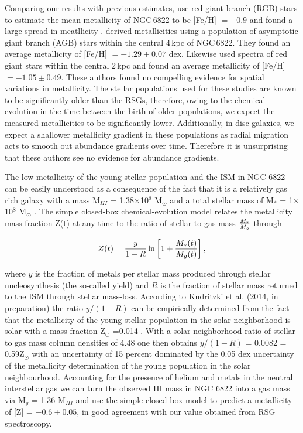 \documentclass[iop]{emulateapj}
\begin{document}
Comparing our results with previous estimates,
\cite{2001MNRAS.327..918T} use red giant branch (RGB) stars to estimate the mean metallicity of NGC\,6822 to be
[Fe/H] $=-0.9$ and found a large spread in meatllicity 
\citep[see Figure 19 in ][]{2001MNRAS.327..918T}.
\cite{2012A&A...540A.135S} derived metallicities using a population of asymptotic giant branch (AGB) stars within the central 4\,kpc of NGC\,6822.
They found an average metallicity of [Fe/H] $=-1.29\pm0.07$ dex.
Likewise
\cite{2013ApJ...779..102K}
used spectra of red giant stars within the central 2\,kpc and found an average metallicity of
[Fe/H] $=-1.05\pm0.49$.
These authors found no compelling evidence for spatial variations in metallicity.
The stellar populations used for these studies are known to be significantly older than the RSGs,
therefore, owing to the chemical evolution in the time between the birth of older populations, we expect the measured metallicities to be significantly lower.
Additionally, in disc galaxies, we expect a shallower metallicity gradient in these populations as radial migration acts to smooth out abundance gradients over time.
Therefore it is unsurprising that these authors see no evidence for abundance gradients.

The low metallicity of the young stellar population and the ISM in NGC 6822 can be easily understood as a consequence of the fact that it is a relatively gas rich galaxy with a mass
M$_{HI}$ = 1.38$\times$10$^{8}$ M$_{\odot}$
\citep{2004AJ....128...16K} and a total stellar mass of
M$_{*}$ = 1$\times$10$^{8}$ M$_{\odot}$
\citep{2014ApJ...789..147W}.
The simple closed-box chemical-evolution model relates the metallicity mass fraction Z(t) at any time to the ratio of stellar to gas mass $M_{*}\over M_{g}$ through

\begin{equation}\label{closed-box}
Z(t) = {y \over 1-R } \ln \left[ 1 + {M_{*}(t)\over M_{g}(t)}  \right],
\end{equation}

where $y$ is the fraction of metals per stellar mass produced through stellar nucleosynthesis
(the so-called yield) and $R$ is the fraction of stellar mass returned to the ISM through stellar mass-loss.
According to Kudritzki et al. (2014, in preparation) the ratio $y/(1-R)$ can be empirically determined from the fact that the metallicity of the young stellar population in the solar neighborhood is solar with a mass fraction Z$_{\odot}$ =0.014
\citep{2012A&A...539A.143N}.
With a solar neighborhood ratio of stellar to gas mass column densities of 4.48
\citep{2003ApJ...587..278W,2013ApJ...779..115B}
one then obtains $y/(1-R)$ = 0.0082 = 0.59Z$_{\odot}$ with an uncertainty of 15 percent dominated by the 0.05 dex uncertainty of the metallicity determination of the young population in the solar neighbourhood.
Accounting for the presence of helium and metals in the neutral interstellar gas we can turn the observed HI mass in NGC 6822 into a gas mass via M$_{g}$ = 1.36 M$_{HI}$ and use the simple closed-box model to predict a metallicity of [Z] = $-0.6\pm0.05$,
in good agreement with our value obtained from RSG spectroscopy.
\end{document}
